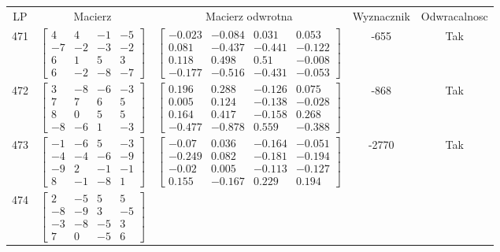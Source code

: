 \documentclass[a4paper,12pt]{article}
\begin{document}
\bgroup {} \vspace{0.2in} \begin{tabular}{c c c c c}
LP & Macierz & Macierz odwrotna & Wyznacznik & Odwracalnosc\\
471
&
$\begin{bmatrix} 4 & 4 & -1 & -5 \\ -7 & -2 & -3 & -2 \\ 6 & 1 & 5 & 3 \\ 6 & -2 & -8 & -7 \end{bmatrix}$
&
$\begin{bmatrix} -0.023 & -0.084 & 0.031 & 0.053 \\ 0.081 & -0.437 & -0.441 & -0.122 \\ 0.118 & 0.498 & 0.51 & -0.008 \\ -0.177 & -0.516 & -0.431 & -0.053 \end{bmatrix}$
&
-655
&
Tak
\\
472
&
$\begin{bmatrix} 3 & -8 & -6 & -3 \\ 7 & 7 & 6 & 5 \\ 8 & 0 & 5 & 5 \\ -8 & -6 & 1 & -3 \end{bmatrix}$
&
$\begin{bmatrix} 0.196 & 0.288 & -0.126 & 0.075 \\ 0.005 & 0.124 & -0.138 & -0.028 \\ 0.164 & 0.417 & -0.158 & 0.268 \\ -0.477 & -0.878 & 0.559 & -0.388 \end{bmatrix}$
&
-868
&
Tak
\\
473
&
$\begin{bmatrix} -1 & -6 & 5 & -3 \\ -4 & -4 & -6 & -9 \\ -9 & 2 & -1 & -1 \\ 8 & -1 & -8 & 1 \end{bmatrix}$
&
$\begin{bmatrix} -0.07 & 0.036 & -0.164 & -0.051 \\ -0.249 & 0.082 & -0.181 & -0.194 \\ -0.02 & 0.005 & -0.113 & -0.127 \\ 0.155 & -0.167 & 0.229 & 0.194 \end{bmatrix}$
&
-2770
&
Tak
\\
474
&
$\begin{bmatrix} 2 & -5 & 5 & 5 \\ -8 & -9 & 3 & -5 \\ -3 & -8 & -5 & 3 \\ 7 & 0 & -5 & 6 \end{bmatrix}$

\end{tabular}
\end{document}
